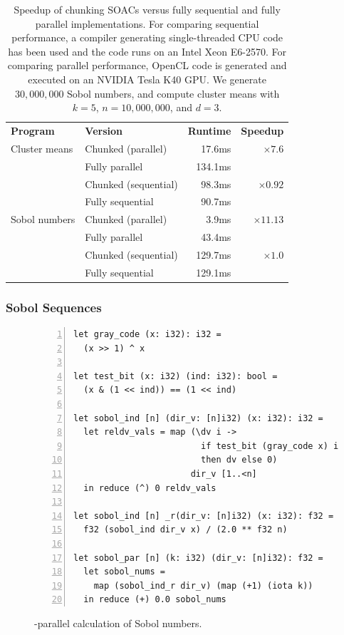 \begin{table}
  \centering
  \begin{tabular}{llrr}
    \textbf{Program} & \textbf{Version}  & \textbf{Runtime} & \textbf{Speedup} \\
\multirow{4}{*}{Cluster means} & Chunked (parallel) & 17.6ms & \multirow{2}{*}{$\times7.6$} \\
& Fully parallel & 134.1ms & \\\cline{2-4}
& Chunked (sequential) & 98.3ms & \multirow{2}{*}{$\times0.92$} \\
& Fully sequential & 90.7ms & \\\hline

\multirow{4}{*}{Sobol numbers} & Chunked (parallel) & 3.9ms & \multirow{2}{*}{$\times11.13$} \\
& Fully parallel & 43.4ms & \\\cline{2-4}
& Chunked (sequential) & 129.7ms & \multirow{2}{*}{$\times1.0$} \\
& Fully sequential & 129.1ms & \\
  \end{tabular}
  \caption{Speedup of chunking SOACs versus fully sequential and
    fully parallel implementations.  For comparing sequential
    performance, a compiler generating single-threaded CPU code has
    been used and the code runs on an Intel Xeon E6-2570.  For
    comparing parallel performance, OpenCL code is generated and
    executed on an NVIDIA Tesla K40 GPU.  We generate $30,000,000$
    Sobol numbers, and compute cluster means with
    $k=5$, $n=10,000,000$, and $d=3$.}
  \label{tab:streaming-perf}
\end{table}

\subsubsection{Sobol Sequences}
\label{sec:sobolsequences}

\begin{figure}
\begin{lstlisting}[numbers=left]
let gray_code (x: i32): i32 =
  (x >> 1) ^ x

let test_bit (x: i32) (ind: i32): bool =
  (x & (1 << ind)) == (1 << ind)

let sobol_ind [n] (dir_v: [n]i32) (x: i32): i32 =
  let reldv_vals = map (\dv i ->
                         if test_bit (gray_code x) i
                         then dv else 0)
                       dir_v [1..<n]
  in reduce (^) 0 reldv_vals

let sobol_ind [n] _r(dir_v: [n]i32) (x: i32): f32 =
  f32 (sobol_ind dir_v x) / (2.0 ** f32 n)

let sobol_par [n] (k: i32) (dir_v: [n]i32): f32 =
  let sobol_nums =
    map (sobol_ind_r dir_v) (map (+1) (iota k))
  in reduce (+) 0.0 sobol_nums
\end{lstlisting}
\caption{-parallel calculation of Sobol numbers.}
\label{fig:parallel-sobol}
\end{figure}

